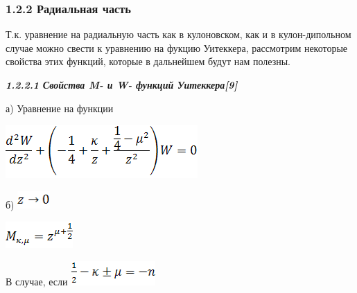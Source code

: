 \documentclass{article}
\begin{document}
\vspace{10pt}
\subsubsection*{{\color{color17} \textbf{1.2.2 Радиальная часть}}}

\vspace{10pt}
\baselineskip=18pt
{\large{}Т.к. уравнение на радиальную часть как 
в кулоновском, как и в кулон-дипольном случае 
можно свести к уравнению на фукцию Уитеккера, 
рассмотрим некоторые свойства этих функций, 
которые в дальнейшем будут нам полезны.\label{HToc453749984}}

\vspace{10pt}
\baselineskip=13pt
{\color{color17} \textit{\textbf{1.2.2.1 Свойства M- и W- функций 
Уитеккера[9]}}}

\vspace{10pt}
\baselineskip=18pt
{\large{}а) Уравнение на функции}

\vspace{10pt}
\includegraphics[width=208pt, height=58pt, keepaspectratio=true]{3-fig001.png}

\vspace{28pt}
{\large{}б) }
\includegraphics[width=35pt, height=19pt, keepaspectratio=true]{3-fig002.png}

\vspace{10pt}
\includegraphics[width=73pt, height=29pt, keepaspectratio=true]{3-fig003.png}

\vspace{28pt}
{\large{}В случае, если }
\includegraphics[width=92pt, height=26pt, keepaspectratio=true]{3-fig004.png}
\end{document}
